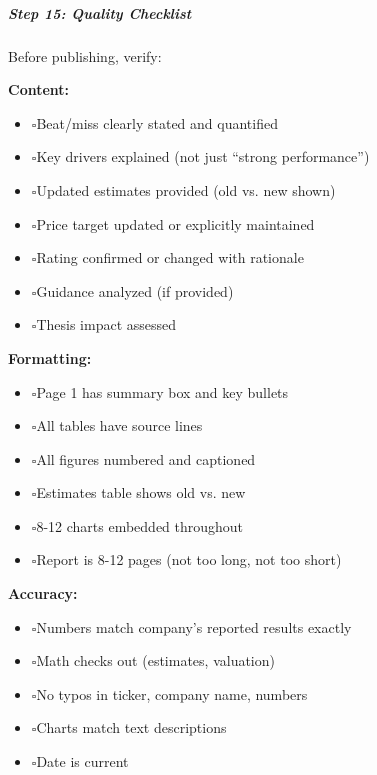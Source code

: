 \documentclass[11pt]{article}
\newcommand{\UncheckedBox}{$\square$}
\begin{document}
\subparagraph{Step 15: Quality Checklist}\mbox{}\par

Before publishing, verify:


\textbf{Content:}

\begin{itemize}[leftmargin=*,itemsep=2pt,topsep=2pt]
\item {} \UncheckedBox Beat/miss clearly stated and quantified
\item {} \UncheckedBox Key drivers explained (not just ``strong performance'')
\item {} \UncheckedBox Updated estimates provided (old vs. new shown)
\item {} \UncheckedBox Price target updated or explicitly maintained
\item {} \UncheckedBox Rating confirmed or changed with rationale
\item {} \UncheckedBox Guidance analyzed (if provided)
\item {} \UncheckedBox Thesis impact assessed
\end{itemize}

\textbf{Formatting:}

\begin{itemize}[leftmargin=*,itemsep=2pt,topsep=2pt]
\item {} \UncheckedBox Page 1 has summary box and key bullets
\item {} \UncheckedBox All tables have source lines
\item {} \UncheckedBox All figures numbered and captioned
\item {} \UncheckedBox Estimates table shows old vs. new
\item {} \UncheckedBox 8-12 charts embedded throughout
\item {} \UncheckedBox Report is 8-12 pages (not too long, not too short)
\end{itemize}

\textbf{Accuracy:}

\begin{itemize}[leftmargin=*,itemsep=2pt,topsep=2pt]
\item {} \UncheckedBox Numbers match company's reported results exactly
\item {} \UncheckedBox Math checks out (estimates, valuation)
\item {} \UncheckedBox No typos in ticker, company name, numbers
\item {} \UncheckedBox Charts match text descriptions
\item {} \UncheckedBox Date is current
\end{itemize}
\end{document}
